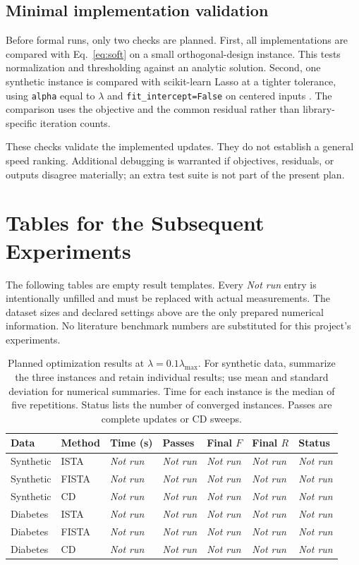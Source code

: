 \documentclass[11pt,a4paper]{article}
\newcommand{\pending}{\textit{Not run}}
\begin{document}
\subsection{Minimal implementation validation}
Before formal runs, only two checks are planned. First, all implementations are compared with Eq.~\eqref{eq:soft} on a small orthogonal-design instance. This tests normalization and thresholding against an analytic solution. Second, one synthetic instance is compared with scikit-learn Lasso at a tighter tolerance, using \texttt{alpha} equal to $\lambda$ and \texttt{fit\_intercept=False} on centered inputs \cite{sklearn_data}. The comparison uses the objective and the common residual rather than library-specific iteration counts.

These checks validate the implemented updates. They do not establish a general speed ranking. Additional debugging is warranted if objectives, residuals, or outputs disagree materially; an extra test suite is not part of the present plan.

\section{Tables for the Subsequent Experiments}
The following tables are empty result templates. Every \emph{Not run} entry is intentionally unfilled and must be replaced with actual measurements. The dataset sizes and declared settings above are the only prepared numerical information. No literature benchmark numbers are substituted for this project's experiments.

\begin{table}[htbp]
\centering\small
\begin{tabularx}{\linewidth}{@{}llYYYYY@{}}
\toprule
Data & Method & Time (s) & Passes & Final $F$ & Final $R$ & Status\\
\midrule
Synthetic & ISTA & \pending & \pending & \pending & \pending & \pending\\
Synthetic & FISTA & \pending & \pending & \pending & \pending & \pending\\
Synthetic & CD & \pending & \pending & \pending & \pending & \pending\\
Diabetes & ISTA & \pending & \pending & \pending & \pending & \pending\\
Diabetes & FISTA & \pending & \pending & \pending & \pending & \pending\\
Diabetes & CD & \pending & \pending & \pending & \pending & \pending\\
\bottomrule
\end{tabularx}
\caption{Planned optimization results at $\lambda=0.1\lambda_{\max}$. For synthetic data, summarize the three instances and retain individual results; use mean and standard deviation for numerical summaries. Time for each instance is the median of five repetitions. Status lists the number of converged instances. Passes are complete updates or CD sweeps.}
\label{tab:optimization_results}
\end{table}
\end{document}
